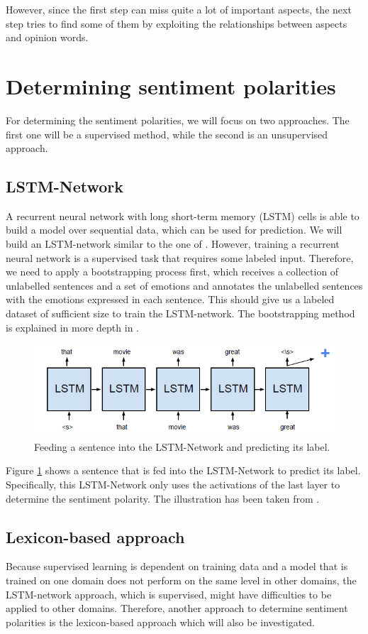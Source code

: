 \documentclass[10pt,a4paper]{article}
\begin{document}
	However, since the first step can miss quite a lot of important aspects, the next step tries to find some of them by exploiting the relationships between aspects and opinion words.
	
	\section{Determining sentiment polarities}
	For determining the sentiment polarities, we will focus on two approaches. The first one will be a supervised method, while the second is an unsupervised approach.
	
		\subsection{LSTM-Network}
		\label{sec:lstm}
		A recurrent neural network with long short-term memory (LSTM) cells is able to build a model over sequential data, which can be used for prediction. We will build an LSTM-network similar to the one of \cite{hongsentiment}. However, training a recurrent neural network is a supervised task that requires some labeled input. Therefore, we need to apply a bootstrapping process first, which receives a collection of unlabelled sentences and a set of emotions and annotates the unlabelled sentences with the emotions expressed in each sentence. This should give us a labeled dataset of sufficient size to train the LSTM-network. The bootstrapping method is explained in more depth in \cite{bootstrapping}.
		
		\begin{figure}[h]
			\centering
			\includegraphics[width=0.7\linewidth]{data/lstm}
			\caption{Feeding a sentence into the LSTM-Network and predicting its label.}
			\label{fig:lstm}
		\end{figure}
		
		Figure \ref{fig:lstm} shows a sentence that is fed into the LSTM-Network to predict its label. Specifically, this LSTM-Network only uses the activations of the last layer to determine the sentiment polarity. The illustration has been taken from \cite{hongsentiment}.
		
		\subsection{Lexicon-based approach}
		Because supervised learning is dependent on training data and a model that is trained on one domain does not perform on the same level in other domains, the LSTM-network approach, which is supervised, might have difficulties to be applied to other domains. Therefore, another approach to determine sentiment polarities is the lexicon-based approach which will also be investigated.
		
\end{document}
